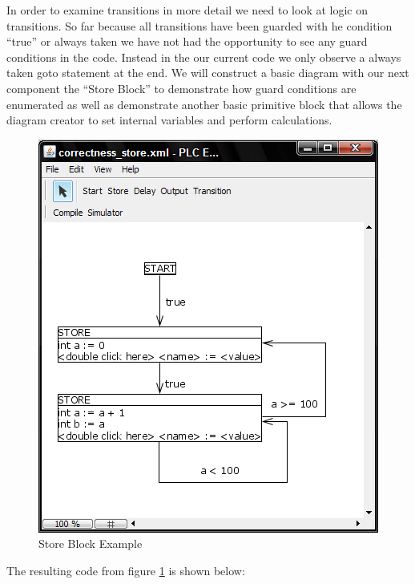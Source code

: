 In order to examine transitions in more detail we need to look at logic on transitions. So far because all transitions have been guarded with he condition ``true'' or always taken we have not had the opportunity to see any guard conditions in the code. Instead in the our current code we only observe a always taken goto statement at the end. We will construct a basic diagram with our next component the ``Store Block'' to demonstrate how guard conditions are enumerated as well as demonstrate another basic primitive block that allows the diagram creator to set internal variables and perform calculations.

\begin{figure}[htb]
	\centering
	\includegraphics[width=\imgmedphoto]{./images/correctness_ex_store.png}
	\caption{Store Block Example}
	\label{fig:correctness_ex_store}
\end{figure}

The resulting code from figure \ref{fig:correctness_ex_store} is shown below:

